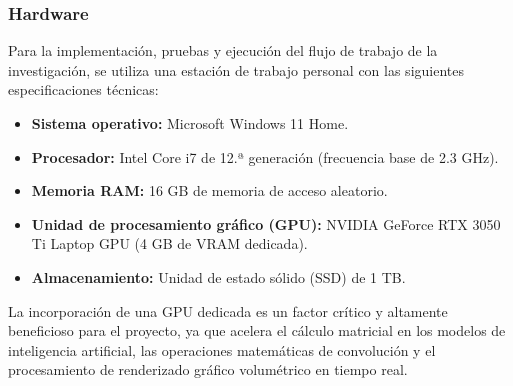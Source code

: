 \subsubsection{Hardware}
Para la implementación, pruebas y ejecución del flujo de trabajo de la investigación, se 
utiliza una estación de trabajo personal con las siguientes especificaciones técnicas:
\begin{itemize}
    \item \textbf{Sistema operativo:} Microsoft Windows 11 Home.
    \item \textbf{Procesador:} Intel Core i7 de 12.ª generación (frecuencia base de 2.3 GHz).
    \item \textbf{Memoria RAM:} 16 GB de memoria de acceso aleatorio.
    \item \textbf{Unidad de procesamiento gráfico (GPU):} NVIDIA GeForce RTX 3050 Ti Laptop 
    GPU (4 GB de VRAM dedicada).
    \item \textbf{Almacenamiento:} Unidad de estado sólido (SSD) de 1 TB.
\end{itemize}

La incorporación de una GPU dedicada es un factor crítico y altamente beneficioso para el 
proyecto, ya que acelera el cálculo matricial en los modelos de inteligencia artificial, 
las operaciones matemáticas de convolución y el procesamiento de renderizado gráfico 
volumétrico en tiempo real.